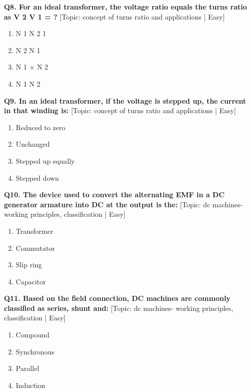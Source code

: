 \noindent\textbf{Q8. For an ideal transformer, the voltage ratio equals the turns ratio as V 2 V 1 = ?} \hfill [Topic: concept of turns ratio and applications | Easy]
\begin{enumerate}[label=(\alph*),topsep=2pt,itemsep=1pt,partopsep=0pt,parsep=0pt]
    \item {N 1 N 2 1}
    \item {N 2 N 1}
    \item {N 1 $\times$ N 2}
    \item {N 1 N 2}
\end{enumerate}
\vspace{2mm}

\noindent\textbf{Q9. In an ideal transformer, if the voltage is stepped up, the current in that winding is:} \hfill [Topic: concept of turns ratio and applications | Easy]
\begin{enumerate}[label=(\alph*),topsep=2pt,itemsep=1pt,partopsep=0pt,parsep=0pt]
    \item {Reduced to zero}
    \item {Unchanged}
    \item {Stepped up equally}
    \item {Stepped down}
\end{enumerate}
\vspace{2mm}

\noindent\textbf{Q10. The device used to convert the alternating EMF in a DC generator armature into DC at the output is the:} \hfill [Topic: dc machines- working principles, classification | Easy]
\begin{enumerate}[label=(\alph*),topsep=2pt,itemsep=1pt,partopsep=0pt,parsep=0pt]
    \item {Transformer}
    \item {Commutator}
    \item {Slip ring}
    \item {Capacitor}
\end{enumerate}
\vspace{2mm}

\noindent\textbf{Q11. Based on the field connection, DC machines are commonly classified as series, shunt and:} \hfill [Topic: dc machines- working principles, classification | Easy]
\begin{enumerate}[label=(\alph*),topsep=2pt,itemsep=1pt,partopsep=0pt,parsep=0pt]
    \item {Compound}
    \item {Synchronous}
    \item {Parallel}
    \item {Induction}
\end{enumerate}
\vspace{2mm}


